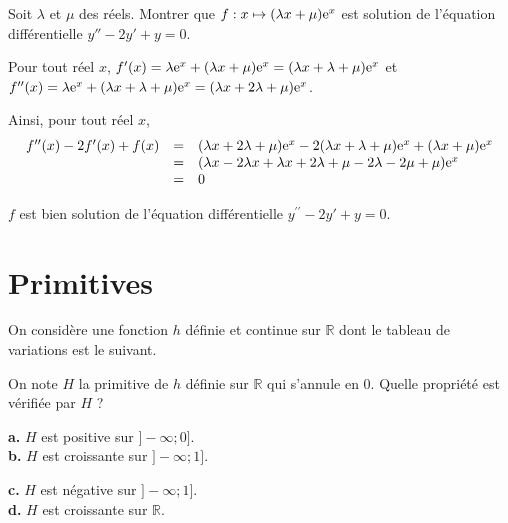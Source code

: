\documentclass[11pt,fleqn, openany]{book} %
\begin{document}
\begin{exercise}Soit $\lambda$ et $\mu$ des réels. Montrer que $f:x\mapsto (\lambda x + \mu)\mathrm{e}^{x}$ est solution de l'équation différentielle $y''-2y'+y=0$.\end{exercise}

\begin{solution}

Pour tout réel \(x\), $f'(x)= \lambda \mathrm{e}^x + (\lambda x + \mu) \mathrm{e}^x = (\lambda x + \lambda + \mu) \mathrm{e}^x$
et $f^{\prime\prime}(x)=\lambda \mathrm{e}^x + (\lambda x + \lambda + \mu) \mathrm{e}^x = (\lambda x + 2\lambda + \mu) \mathrm{e}^x$.

Ainsi, pour tout réel \(x\),
\[\begin{array}{rcl}f^{\prime\prime}(x)-2f'(x)+f(x)&=&(\lambda x + 2\lambda + \mu) \mathrm{e}^x - 2 (\lambda x + \lambda + \mu) \mathrm{e}^x + (\lambda x + \mu)\mathrm{e}^{x} \\ &=& (\lambda x - 2 \lambda x + \lambda x +2 \lambda + \mu -2 \lambda - 2 \mu + \mu)\mathrm{e}^x \\&=&0\end{array}\]

\(f\) est bien solution de l'équation différentielle \(y^{\prime\prime}-2y'+y=0\).

\end{solution}



\section*{Primitives}

\begin{exercise}[subtitle={(Centres étrangers 2023)}]On considère une fonction $h$ définie et continue sur $\mathbb{R}$ dont le tableau de variations est le suivant.

\begin{center}
\end{center}
On note $H$ la primitive de $h$ définie sur $\mathbb{R}$ qui s'annule en 0. Quelle propriété est vérifiée par $H$ ?

\begin{minipage}{0.45\linewidth}
\textbf{a.} $H$ est positive sur $]-\infty ;0]$. \\
\textbf{b.} $H$ est croissante sur $]-\infty ;1]$.
\end{minipage}\hfill \begin{minipage}{0.45\linewidth}
\textbf{c.} $H$ est négative sur $]-\infty ;1]$. \\
\textbf{d.} $H$ est croissante sur $\mathbb{R}$.
\end{minipage}
\end{exercise}
\end{document}

